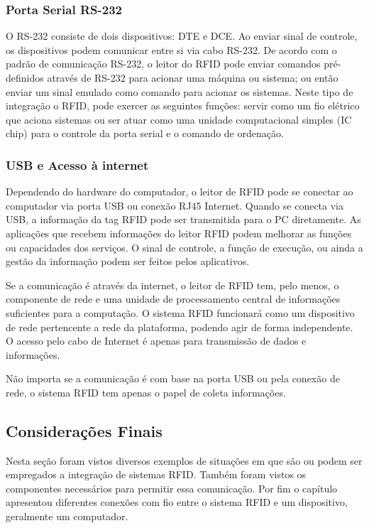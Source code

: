 		
\subsubsection{Porta Serial RS-232}
O RS-232 consiste de dois dispositivos: DTE e DCE. Ao enviar sinal de controle, os dispositivos podem comunicar entre si via cabo RS-232. De acordo com o padrão de comunicação RS-232, o leitor do RFID pode enviar comandos pré-definidos através de RS-232 para acionar uma máquina ou sistema; ou então enviar um sinal emulado como comando para acionar os sistemas. Neste tipo de integração o RFID, pode exercer as seguintes funções: servir como um fio elétrico que aciona sistemas ou ser atuar como uma unidade computacional simples (IC chip) para o controle da porta serial e o comando de ordenação.


\subsubsection{USB e Acesso à internet}
Dependendo do hardware do computador, o leitor de RFID pode se conectar ao computador via porta USB ou conexão RJ45 Internet. Quando se conecta via USB, a informação da tag RFID pode ser transmitida para o PC diretamente. As aplicações que recebem informações do leitor RFID podem melhorar as funções ou capacidades dos serviços. O sinal de controle, a função de execução, ou ainda a gestão da informação podem ser feitos pelos aplicativos.

		Se a comunicação é através da internet, o leitor de RFID tem, pelo menos, o componente de rede e uma unidade de processamento central de informações suficientes para a computação. O sistema RFID funcionará como um dispositivo de rede pertencente a rede da plataforma, podendo agir de forma independente. O acesso pelo cabo de Internet é apenas para transmissão de dados e informações.
		
		Não importa se a comunicação é com base na porta USB ou pela conexão de rede, o sistema RFID tem apenas o papel de coleta informações.




\subsection{Considerações Finais}
Nesta seção foram vistos diversos exemplos de situações em que são ou podem ser empregados a integração de sistemas RFID. Também foram vistos os componentes necessários para permitir essa comunicação.
Por fim o capítulo apresentou diferentes conexões com fio entre o sistema RFID e um dispositivo, geralmente um computador.

		
	